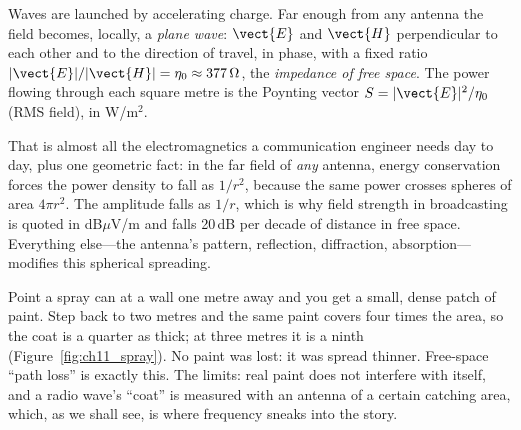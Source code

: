 Waves are launched by accelerating charge. Far enough from any antenna the field becomes, locally,
a \emph{plane wave}: $\vect{E}$ and $\vect{H}$ perpendicular to each other and to the direction of
travel, in phase, with a fixed ratio $|\vect{E}|/|\vect{H}|=\eta_0\approx377\,\Omega$, the
\emph{impedance of free space}. The power flowing through each square metre is the Poynting
vector $S=|\vect{E}|^2/\eta_0$ (RMS field), in W/m$^2$.



That is almost all the electromagnetics a communication engineer needs day to day, plus one
geometric fact: in the far field of \emph{any} antenna, energy conservation forces the power
density to fall as $1/r^2$, because the same power crosses spheres of area $4\pi r^2$. The
amplitude falls as $1/r$, which is why field strength in broadcasting is quoted in dB$\mu$V/m
and falls 20\,dB per decade of distance in free space. Everything else---the antenna's pattern,
reflection, diffraction, absorption---modifies this spherical spreading.

\begin{analogy}
Point a spray can at a wall one metre away and you get a small, dense patch of paint. Step back
to two metres and the same paint covers four times the area, so the coat is a quarter as thick;
at three metres it is a ninth (Figure~\ref{fig:ch11_spray}). No paint was lost: it was spread
thinner. Free-space ``path loss'' is exactly this. The limits: real paint does not interfere
with itself, and a radio wave's ``coat'' is measured with an antenna of a certain catching area,
which, as we shall see, is where frequency sneaks into the story.
\end{analogy}


